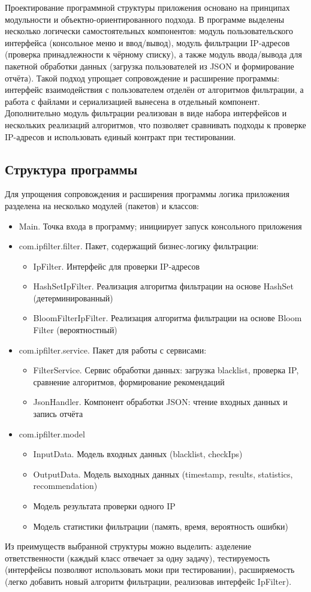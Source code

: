 Проектирование программной структуры приложения основано на принципах модульности и объектно-ориентированного подхода. В программе выделены несколько логически самостоятельных компонентов: модуль пользовательского интерфейса (консольное меню и ввод/вывод), модуль фильтрации IP-адресов (проверка принадлежности к чёрному списку), а также модуль ввода/вывода для пакетной обработки данных (загрузка пользователей из JSON и формирование отчёта).
Такой подход упрощает сопровождение и расширение программы: интерфейс взаимодействия с пользователем отделён от алгоритмов фильтрации, а работа с файлами и сериализацией вынесена в отдельный компонент.
Дополнительно модуль фильтрации реализован в виде набора интерфейсов и нескольких реализаций алгоритмов, что позволяет сравнивать подходы к проверке IP-адресов и использовать единый контракт при тестировании.

\subsection{Структура программы}

Для упрощения сопровождения и расширения программы логика приложения разделена на несколько модулей (пакетов) и классов:

\begin{itemize}
    \item Main. Точка входа в программу; инициирует запуск консольного приложения
    \item com.ipfilter.filter. Пакет, содержащий бизнес-логику фильтрации:
    \begin{itemize}
        \item IpFilter. Интерфейс для проверки IP-адресов
        \item HashSetIpFilter. Реализация алгоритма фильтрации на основе HashSet (детерминированный)
        \item BloomFilterIpFilter. Реализация алгоритма фильтрации на основе Bloom Filter (вероятностный)
    \end{itemize}
    \item com.ipfilter.service. Пакет для работы с сервисами:
    \begin{itemize}
        \item FilterService. Сервис обработки данных: загрузка blacklist, проверка IP, сравнение алгоритмов, формирование рекомендаций
        \item JsonHandler. Компонент обработки JSON: чтение входных данных и запись отчёта
    \end{itemize}
    \item com.ipfilter.model
    \begin{itemize}
        \item InputData. Модель входных данных (blacklist, checkIps)
        \item OutputData. Модель выходных данных (timestamp, results, statistics, recommendation)
        \item Модель результата проверки одного IP
        \item Модель статистики фильтрации (память, время, вероятность ошибки)
    \end{itemize}
\end{itemize}

Из преимуществ выбранной структуры можно выделить: азделение ответственности (каждый класс отвечает за одну задачу), тестируемость (интерфейсы позволяют использовать моки при тестировании), расширяемость (легко добавить новый алгоритм фильтрации, реализовав интерфейс IpFilter).

\newpage